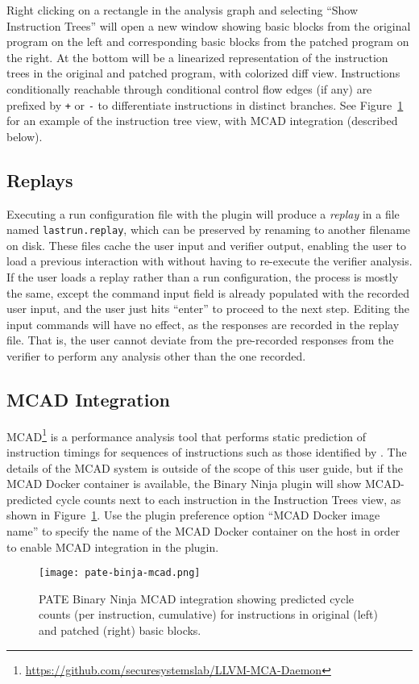 Right clicking on a rectangle in the \pate{} analysis graph and selecting ``Show Instruction Trees'' will open a new window showing basic blocks from the original program on the left and corresponding basic blocks from the patched program on the right.
At the bottom will be a linearized representation of the instruction trees in the original and patched program, with colorized diff view.
Instructions conditionally reachable through conditional control flow edges (if any) are prefixed by \texttt{+} or \texttt{-} to differentiate instructions in distinct branches.
See Figure~\ref{fig:mcad} for an example of the instruction tree view, with MCAD integration (described below).

\subsection{Replays}

Executing a run configuration file with the \pate{} plugin will produce a \emph{replay} in a file named \texttt{lastrun.replay}, which can be preserved by renaming to another filename on disk.
These files cache the user input and verifier output, enabling the user to load a previous interaction with \pate{} without having to re-execute the verifier analysis.
If the user loads a replay rather than a run configuration, the process is mostly the same, except the command input field is already populated with the recorded user input, and the user just hits ``enter'' to proceed to the next step.
Editing the input commands will have no effect, as the responses are recorded in the replay file.
That is, the user cannot deviate from the pre-recorded responses from the \pate{} verifier to perform any analysis other than the one recorded.

\subsection{MCAD Integration}

MCAD\footnote{\url{https://github.com/securesystemslab/LLVM-MCA-Daemon}} is a performance analysis tool that performs static prediction of instruction timings for sequences of instructions such as those identified by \pate{}.
The details of the MCAD system is outside of the scope of this user guide, but if the MCAD Docker container is available, the \pate{} Binary Ninja plugin will show MCAD-predicted cycle counts next to each instruction in the Instruction Trees view, as shown in Figure~\ref{fig:mcad}.
Use the \pate{} plugin preference option ``MCAD Docker image name'' to specify the name of the MCAD Docker container on the host in order to enable MCAD integration in the \pate{} plugin.

\begin{figure}[h]
  \centering
  \texttt{[image: pate-binja-mcad.png]}
  \caption{PATE Binary Ninja MCAD integration showing predicted cycle counts (per instruction, cumulative) for instructions in original (left) and patched (right) basic blocks.}
  \label{fig:mcad}
\end{figure}